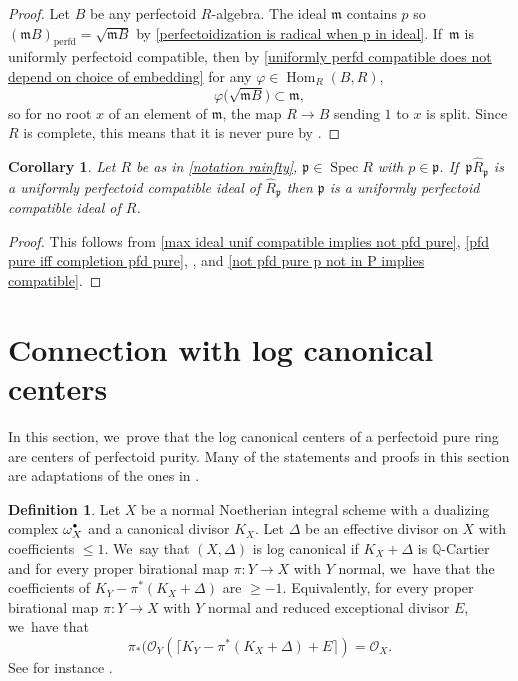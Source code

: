 \documentclass[11pt]{article}
\let\autoref\cref
\newcommand{\sbullet}{{\scriptscriptstyle\bullet}}
\newcommand{\csbullet}{{\raisebox{1pt}{$\sbullet$}}}
\theoremstyle{plain}
\newtheorem{corollary}[theorem]{Corollary}
\theoremstyle{definition}
\newtheorem{definition}[theorem]{Definition}
\numberwithin{equation}{theorem}
\newcommand{\Q}{\mathbb {Q}}
\newcommand{\fram}{\mathfrak{m}}
\newcommand{\p}{\mathfrak{p}}
\DeclareMathOperator{\Hom}{Hom}
\newcommand{\perfd}{_{\mathrm{perfd}}}
\DeclareMathOperator{\Spec}{{Spec}}
\newcommand{\sO}{\mathcal{O}}
\renewcommand{\phi}{\varphi}
\begin{document}
\begin{proof}
Let $B$ be any perfectoid $R$\nobreakdash-algebra.
The ideal $\fram$ contains $p$ so $(\fram B)\perfd=\sqrt{\fram B}$ by \autoref{perfectoidization is radical when p in ideal}. If~$\fram$ is uniformly perfectoid compatible, then by \autoref{uniformly perfd compatible does not depend on choice of embedding} for any $\phi\in \Hom_R(B,R)$,
\[
\phi\bigl(\sqrt{\fram B}\bigr)\subset \fram,
\]
so for no root $x$ of an element of $\fram$, the map $R\to B$ sending $1$ to $x$ is split. Since $R$ is complete, this means that it is never pure by \cite[Lem.\,1.2]{FedderFPureRat}.
\end{proof}

\begin{corollary}\label{loc is uniformly compatible then ideal is uniformly compatible}
Let $R$ be as in \autoref{notation rainfty}, $\p\in \Spec R$ with $p\in \p$. If~$\p \widehat{R}_\p$ is a uniformly perfectoid compatible ideal of $\widehat{R}_\p$ then $\p$ is a uniformly perfectoid compatible ideal of $R$.
\end{corollary}

\begin{proof}
This follows from \autoref{max ideal unif compatible implies not pfd pure}, \autoref{pfd pure iff completion pfd pure}, \cite[Ex.\,3.8\,(7)]{BhattIyengarMaRegularRings},
and \autoref{not pfd pure p not in P implies compatible}.
\end{proof}

\section{Connection with log canonical centers}

In this section, we~prove that the log canonical centers of a perfectoid pure ring are centers of perfectoid purity. Many of the statements and proofs in this section are adaptations of the ones in \cite{BMPSTWWPerfectoidPure}.

\begin{definition}
Let $X$ be a normal Noetherian integral scheme with a dualizing complex $\omega^\csbullet_X$ and a canonical divisor $K_X$. Let $\Delta$ be an effective divisor on $X$ with coefficients $\leq 1$. We~say that $(X,\Delta)$ is log canonical if $K_X+\Delta$ is $\Q$-Cartier and for every proper birational map $\pi\colon Y\to X$ with $Y$ normal, we~have that the coefficients of $K_Y-\pi^*(K_X+\Delta)$ are $\geq -1$. Equivalently, for every proper birational map $\pi\colon Y\to X$ with $Y$ normal and reduced exceptional divisor $E$, we~have that
\begin{equation}\label{def lc}
\pi_*(\sO_Y(\lceil K_Y - \pi^*(K_X+\Delta) + E\rceil)=\sO_X.
\end{equation}
See for instance \cite[Cor.\,2.31]{KollarMori}.
\end{definition}
\end{document}
